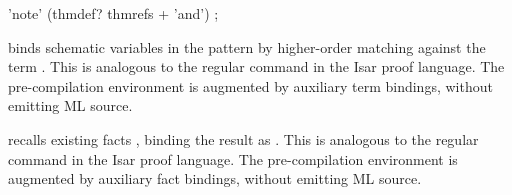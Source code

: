 \begin{isabellebody}
\begin{isamarkuptext}
\begin{rail}
  'note' (thmdef? thmrefs + 'and')
  ;
  \end{rail}

  \begin{description}

  \item {} binds schematic variables in the
  pattern  by higher-order matching against the term .  This is analogous to the regular \hyperlink{command.let}{\mbox{}} command
  in the Isar proof language.  The pre-compilation environment is
  augmented by auxiliary term bindings, without emitting ML source.

  \item {} recalls existing facts , binding the result as .  This is analogous to
  the regular \hyperlink{command.note}{\mbox{}} command in the Isar proof language.
  The pre-compilation environment is augmented by auxiliary fact
  bindings, without emitting ML source.


\end{description}
\end{isamarkuptext}
\end{isabellebody}
